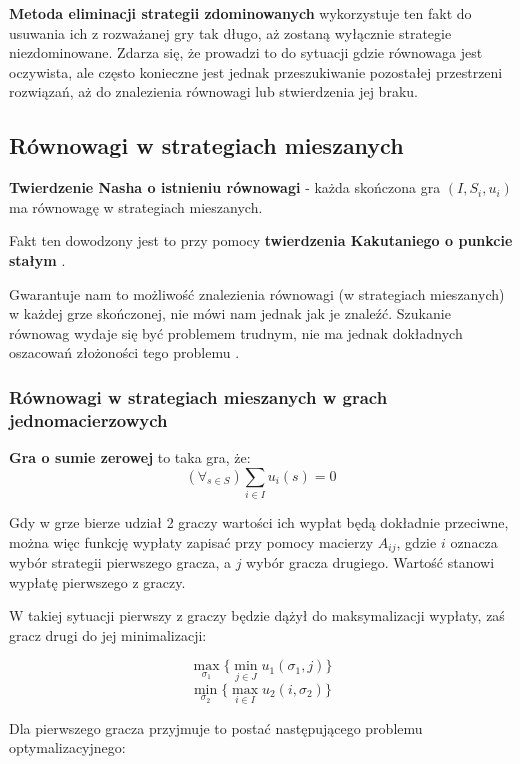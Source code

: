 \documentclass[polish]{standalone}
\begin{document}
\textbf{Metoda eliminacji strategii zdominowanych} wykorzystuje ten fakt do usuwania ich z rozważanej gry tak długo, aż
zostaną wyłącznie strategie niezdominowane. Zdarza się, że prowadzi to do sytuacji gdzie równowaga jest oczywista, ale
często konieczne jest jednak przeszukiwanie pozostałej przestrzeni rozwiązań, aż do znalezienia równowagi lub
stwierdzenia jej braku.

\subsection{Równowagi w strategiach mieszanych}

\begin{theorem}
\textbf{Twierdzenie Nasha o istnieniu równowagi} - każda skończona gra $(I, S_i, u_i)$ ma równowagę w strategiach
mieszanych.
\cite[str.~29]{FT-GT}
\end{theorem}

Fakt ten dowodzony jest to przy pomocy \textbf{twierdzenia Kakutaniego o punkcie stałym} \cite[str.~29]{FT-GT}.

Gwarantuje nam to możliwość znalezienia równowagi (w strategiach mieszanych) w każdej grze skończonej, nie mówi nam
jednak jak je znaleźć. Szukanie równowag wydaje się być problemem trudnym, nie ma jednak dokładnych oszacowań złożoności
tego problemu \cite{P-AGI}.

\subsubsection{Równowagi w strategiach mieszanych w grach jednomacierzowych}

\begin{definition}
\textbf{Gra o sumie zerowej} to taka gra, że:
$$(\forall_{s \in S}) \sum_{i \in I} u_i(s) = 0$$
\end{definition}

Gdy w grze bierze udział 2 graczy wartości ich wypłat będą dokładnie przeciwne, można więc funkcję wypłaty zapisać przy
pomocy macierzy $A_{ij}$, gdzie $i$ oznacza wybór strategii pierwszego gracza, a $j$ wybór gracza drugiego. Wartość
stanowi wypłatę pierwszego z graczy.

W takiej sytuacji pierwszy z graczy będzie dążył do maksymalizacji wypłaty, zaś gracz drugi do jej minimalizacji:

$$\max_{\sigma_1} \{ \min_{j \in J} u_1(\sigma_1, j) \}$$
$$\min_{\sigma_2} \{ \max_{i \in I} u_2(i, \sigma_2) \}$$

Dla pierwszego gracza przyjmuje to postać następującego problemu optymalizacyjnego:
\end{document}
